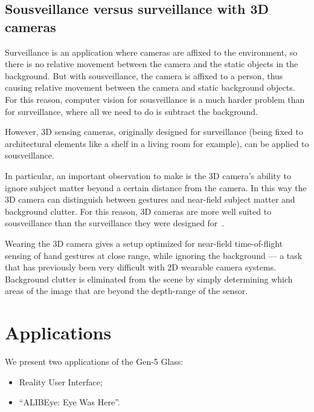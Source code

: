 \subsection{Sousveillance versus surveillance with 3D cameras}
Surveillance is an application where cameras are affixed to the environment,
so there is no relative movement between the camera and the static
objects in the background.
But with sousveillance, the camera is affixed to a person, thus causing
relative movement between the camera and static background objects.
For this reason, computer vision for
sousveillance is a much harder problem than for surveillance, where all we
need to do is subtract the background.

However, 3D sensing cameras, originally designed for surveillance
(being fixed to architectural elements like a shelf in a living room for
example), can be applied to sousveillance.

In particular, an important observation to make is the 3D camera's ability
to ignore subject matter beyond a certain distance from the camera.
In this way the 3D camera can distinguish between gestures and near-field
subject matter and background clutter.
For this reason, 3D cameras are more well suited to sousveillance than
the surveillance they were designed for~\cite{mann2011blind}.

Wearing the 3D camera gives a setup optimized for near-field time-of-flight sensing
of hand gestures at close range, while ignoring the background --- a task
that has previously been very difficult with 2D wearable camera systems.
Background clutter is eliminated from the scene by simply determining
which areas of the image that are beyond the depth-range of the sensor.

\section{Applications}
We present two applications of the Gen-5 Glass:
\begin{itemize}
  \item Reality User Interface;
  \item ``ALIBEye: Eye Was Here''.
\end{itemize}

